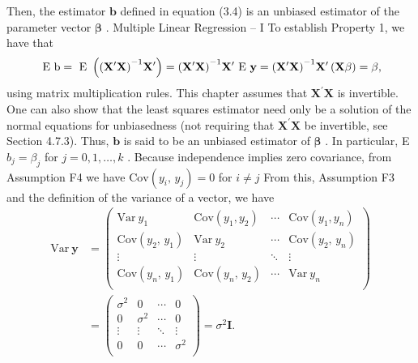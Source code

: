 \documentclass[11pt]{article}
\begin{document}
Then, the estimator \(\mathbf{b}\) defined in equation (3.4) is an unbiased estimator of the
 parameter vector \(\boldsymbol{\beta}\) .
 Multiple Linear Regression -- I
To establish Property 1, we have that
\[
\mathrm{\boldmath~ E ~ b}=\mathrm{\boldmath~ E ~} \left( {\left( {{\bf X^{\prime} X}} \right)^{-1}} {\bf X^{\prime}} \right)={\left( {{\bf X^{\prime} X}} \right)^{-1}} {\bf X^{\prime}} \mathrm{\boldmath~ E ~} \mathbf y={\left( {{\bf X^{\prime} X}} \right)^{-1}} {\bf X^{\prime}} \left( {{\bf X \beta}} \right)=\beta,
\]
using matrix multiplication rules. This chapter assumes that \(\mathbf{X}^{\prime} \mathbf{X}\) is invertible.
One can also show that the least squares estimator need only be a solution of
 the normal equations for unbiasedness (not requiring that \(\mathbf{X}^{\prime} \mathbf{X}\) be invertible, see
Section 4.7.3). Thus, \(\mathbf{b}\) is said to be an unbiased estimator of \(\boldsymbol{\beta}\) . In particular,
E \(b_{j}=\beta_{j}\) for \(j=0 , 1 , \dots, k\) .
 Because independence implies zero covariance, from Assumption F4 we have
\(\mathrm{C o v} ( y_{i} , \, y_{j} )=0\) for \(i \neq j\) From this, Assumption F3 and the definition of the
variance of a vector, we have
\[
\begin{aligned} {\mathrm{V a r ~} \mathbf{y}} & {{}=\left( \begin{matrix} {\mathrm{V a r ~} y_{1}} & {\mathrm{C o v} ( y_{1} , y_{2} )} & {\cdots} & {\mathrm{C o v} ( y_{1} , y_{n} )} \\ {\mathrm{C o v} ( y_{2} , \, y_{1} )} & {\mathrm{V a r ~} y_{2}} & {\cdots} & {\mathrm{C o v} ( y_{2} , \, y_{n} )} \\ {\vdots} & {\vdots} & {\ddots} & {\vdots} \\ {\mathrm{C o v} ( y_{n} , \, y_{1} )} & {\mathrm{C o v} ( y_{n} , \, y_{2} )} & {\cdots} & {\mathrm{V a r ~} y_{n}} \\ \end{matrix} \right)} \\ {} & {{}=\left( \begin{matrix} {\sigma^{2}} & {0} & {\cdots} & {0} \\ {0} & {\sigma^{2}} & {\cdots} & {0} \\ {\vdots} & {\vdots} & {\ddots} & {\vdots} \\ {0} & {0} & {\cdots} & {\sigma^{2}} \\ \end{matrix} \right)=\sigma^{2} \mathbf{I} .} \\ \end{aligned}
\]
\end{document}
